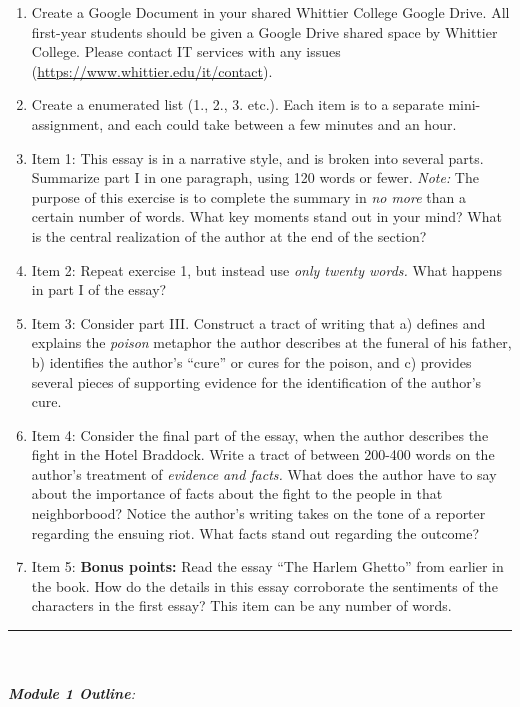\documentclass[10pt]{article}
\begin{document}
\begin{enumerate}
\item Create a Google Document in your shared Whittier College Google Drive.  All first-year students should be given a Google Drive shared space by Whittier College.  Please contact IT services with any issues (\url{https://www.whittier.edu/it/contact}).
\item Create a enumerated list (1., 2., 3. etc.).  Each item is to a separate mini-assignment, and each could take between a few minutes and an hour.
\item Item 1: This essay is in a narrative style, and is broken into several parts.  Summarize part I in one paragraph, using 120 words or fewer.  \textit{Note:} The purpose of this exercise is to complete the summary in \textit{no more} than a certain number of words.  What key moments stand out in your mind?  What is the central realization of the author at the end of the section?
\item Item 2: Repeat exercise 1, but instead use \textit{only twenty words.}  What happens in part I of the essay?
\item Item 3: Consider part III.  Construct a tract of writing that a) defines and explains the \textit{poison} metaphor the author describes at the funeral of his father, b) identifies the author's ``cure'' or cures for the poison, and c) provides several pieces of supporting evidence for the identification of the author's cure.
\item Item 4: Consider the final part of the essay, when the author describes the fight in the Hotel Braddock.  Write a tract of between 200-400 words on the author's treatment of \textit{evidence and facts.}  What does the author have to say about the importance of facts about the fight to the people in that neighborbood?  Notice the author's writing takes on the tone of a reporter regarding the ensuing riot.  What facts stand out regarding the outcome?
\item Item 5: \textbf{Bonus points:} Read the essay ``The Harlem Ghetto'' from earlier in the book.  How do the details in this essay corroborate the sentiments of the characters in the first essay?  This item can be any number of words.
\end{enumerate}
\noindent\rule{18cm}{0.4pt} \\ \\
\clearpage
\textit{\textbf{Module 1 Outline}:}
\end{document}
